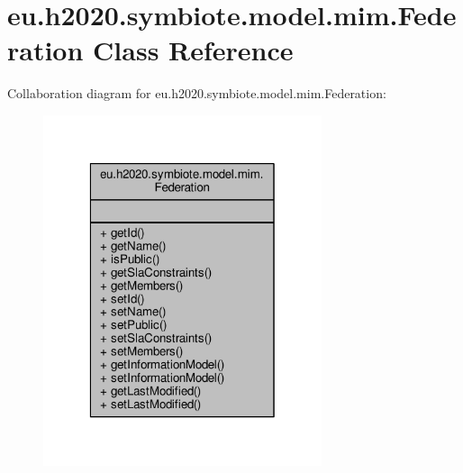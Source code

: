 \hypertarget{classeu_1_1h2020_1_1symbiote_1_1model_1_1mim_1_1Federation}{}\section{eu.\+h2020.\+symbiote.\+model.\+mim.\+Federation Class Reference}
\label{classeu_1_1h2020_1_1symbiote_1_1model_1_1mim_1_1Federation}


Collaboration diagram for eu.\+h2020.\+symbiote.\+model.\+mim.\+Federation\+:\nopagebreak
\begin{figure}[H]
\begin{center}
\leavevmode
\includegraphics[width=232pt]{classeu_1_1h2020_1_1symbiote_1_1model_1_1mim_1_1Federation__coll__graph}
\end{center}
\end{figure}
